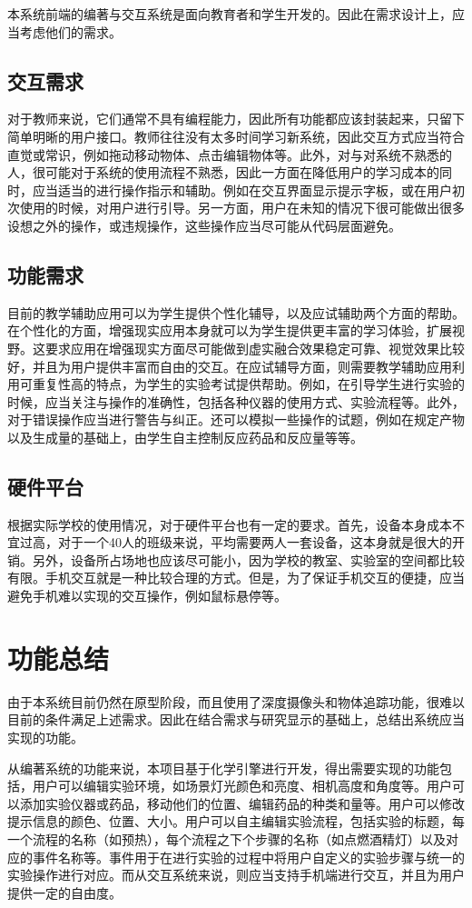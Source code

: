 本系统前端的编著与交互系统是面向教育者和学生开发的。因此在需求设计上，应当考虑他们的需求。

\subsection{交互需求}
对于教师来说，它们通常不具有编程能力，因此所有功能都应该封装起来，只留下简单明晰的用户接口。教师往往没有太多时间学习新系统，因此交互方式应当符合直觉或常识，例如拖动移动物体、点击编辑物体等。此外，对与对系统不熟悉的人，很可能对于系统的使用流程不熟悉，因此一方面在降低用户的学习成本的同时，应当适当的进行操作指示和辅助。例如在交互界面显示提示字板，或在用户初次使用的时候，对用户进行引导。另一方面，用户在未知的情况下很可能做出很多设想之外的操作，或违规操作，这些操作应当尽可能从代码层面避免。

\subsection{功能需求}
目前的教学辅助应用可以为学生提供个性化辅导，以及应试辅助两个方面的帮助。在个性化的方面，增强现实应用本身就可以为学生提供更丰富的学习体验，扩展视野。这要求应用在增强现实方面尽可能做到虚实融合效果稳定可靠、视觉效果比较好，并且为用户提供丰富而自由的交互。在应试辅导方面，则需要教学辅助应用利用可重复性高的特点，为学生的实验考试提供帮助。例如，在引导学生进行实验的时候，应当关注与操作的准确性，包括各种仪器的使用方式、实验流程等。此外，对于错误操作应当进行警告与纠正。还可以模拟一些操作的试题，例如在规定产物以及生成量的基础上，由学生自主控制反应药品和反应量等等。

\subsection{硬件平台}
根据实际学校的使用情况，对于硬件平台也有一定的要求。首先，设备本身成本不宜过高，对于一个40人的班级来说，平均需要两人一套设备，这本身就是很大的开销。另外，设备所占场地也应该尽可能小，因为学校的教室、实验室的空间都比较有限。手机交互就是一种比较合理的方式。但是，为了保证手机交互的便捷，应当避免手机难以实现的交互操作，例如鼠标悬停等。


\section{功能总结}
由于本系统目前仍然在原型阶段，而且使用了深度摄像头和物体追踪功能，很难以目前的条件满足上述需求。因此在结合需求与研究显示的基础上，总结出系统应当实现的功能。

从编著系统的功能来说，本项目基于化学引擎进行开发，得出需要实现的功能包括，用户可以编辑实验环境，如场景灯光颜色和亮度、相机高度和角度等。用户可以添加实验仪器或药品，移动他们的位置、编辑药品的种类和量等。用户可以修改提示信息的颜色、位置、大小。用户可以自主编辑实验流程，包括实验的标题，每一个流程的名称（如预热），每个流程之下个步骤的名称（如点燃酒精灯）以及对应的事件名称等。事件用于在进行实验的过程中将用户自定义的实验步骤与统一的实验操作进行对应。而从交互系统来说，则应当支持手机端进行交互，并且为用户提供一定的自由度。